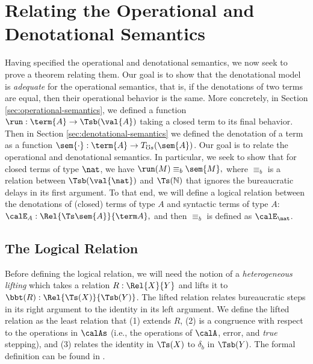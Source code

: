 \documentclass[acmsmall,screen,review,anonymous]{acmart}
\theoremstyle{remark}
\begin{document}
\section{Relating the Operational and Denotational Semantics}\label{sec:relating-the-semantics}

Having specified the operational and denotational semantics, we now seek to
prove a theorem relating them. Our goal is to show that the denotational model
is \emph{adequate} for the operational semantics, that is, if the denotations of
two terms are equal, then their operational behavior is the same.
%
More concretely, in Section \ref{sec:operational-semantics}, we defined a
function $\run : \term{A} \to \Tsb (\val{A})$ taking a closed term to its
final behavior. Then in Section \ref{sec:denotational-semantics} we defined the
denotation of a term as a function $\sem{\cdot} : \term{A} \to T_{\mho
s}(\sem{A})$. Our goal is to relate the operational and denotational semantics.
In particular, we seek to show that for closed terms of type $\nat$, we have
%
$\run(M) \equiv_b \sem{M},$
%
where $\equiv_b$ is a relation between $\Tsb(\val{\nat})$ and $\Ts(\mathbb{N})$
that ignores the bureaucratic delays in its first argument.
%
To that end, we will define a logical relation between the denotations of
(closed) terms of type $A$ and syntactic terms of type $A$:
%
$\calE_A : \Rel {\Ts\sem{A}} {\term A},$
%
and then $\equiv_b$ is defined as $\calE_\nat$. %

\subsection{The Logical Relation}


Before defining the logical relation, we will need the notion of a
\emph{heterogeneous lifting} which takes a relation $R : \Rel{X}{Y}$ and lifts it
to $\bbt(R) : \Rel{\Ts(X)} {\Tsb(Y)}$. The lifted relation relates
bureaucratic steps in its right argument to the identity in its left argument.
We define the lifted relation as the least relation that (1) extends $R$, (2) is
a congruence with respect to the operations in $\calAs$ (i.e., the
operations of $\calA$, error, and \emph{true} stepping), and (3) relates the
identity in $\Ts(X)$ to $\delta_b$ in $\Tsb(Y)$.
%
The formal definition can be found in \citeappendix.
\end{document}
